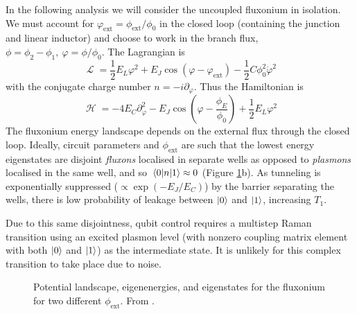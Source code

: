 \documentclass[11pt]{article}
\DeclareMathOperator{\lagr}{\mathcal{L}}
\DeclareMathOperator{\ham}{\mathcal{H}}
\begin{document}
In the following analysis we will consider the uncoupled fluxonium in isolation. We must account for $\varphi_\text{ext} = \phi_\text{ext} / \phi_0$ in the closed loop (containing the junction and linear inductor) and choose to work in the branch flux, $\phi=\phi_2-\phi_1, \ \varphi=\phi/\phi_0$. The Lagrangian is
\begin{equation}
\lagr = \frac{1}{2} E_L \varphi^2 + E_J \cos{\left(\varphi - \varphi_\text{ext}\right)} - \frac{1}{2} C \phi_0^2 \dot{\varphi}^2
\end{equation}
with the conjugate charge number $n = -i \partial_\varphi$. Thus the Hamiltonian is
\begin{equation}
\ham = - 4 E_C \partial_\varphi^2  - E_J \cos{\left(\varphi - \frac{\phi_E}{\phi_0}\right)} + \frac{1}{2} E_L \varphi^2
\end{equation}
The fluxonium energy landscape depends on the external flux through the closed loop. Ideally, circuit parameters and $\phi_\text{ext}$ are such that the lowest energy eigenstates are disjoint \emph{fluxons} localised in separate wells as opposed to \emph{plasmons} localised in the same well, and so $\matrixel{0}{n}{1} \approx 0$ (Figure \ref{fig_fluxoniumenergies}b). As tunneling is exponentially suppressed ($\propto \exp(-E_J/E_C)$) by the barrier separating the wells, there is low probability of leakage between $\ket{0}$ and $\ket{1}$, increasing $T_1$. 

Due to this same disjointness, qubit control requires a multistep Raman transition using an excited plasmon level (with nonzero coupling matrix element with both $\ket{0}$ and $\ket{1}$) as the intermediate state. It is unlikely for this complex transition to take place due to noise.

\begin{figure}[H]
	\centering
	\caption{Potential landscape, eigenenergies, and eigenstates for the fluxonium for two different $\phi_\text{ext}$. From \cite{earnest2018realization}.}
	\label{fig_fluxoniumenergies}
\end{figure}
\end{document}
